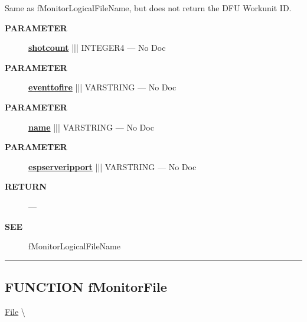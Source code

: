 \par





Same as fMonitorLogicalFileName, but does not return the DFU Workunit ID.






\par
\begin{description}
\item [\colorbox{tagtype}{\color{white} \textbf{\textsf{PARAMETER}}}] \textbf{\underline{shotcount}} ||| INTEGER4 --- No Doc
\item [\colorbox{tagtype}{\color{white} \textbf{\textsf{PARAMETER}}}] \textbf{\underline{eventtofire}} ||| VARSTRING --- No Doc
\item [\colorbox{tagtype}{\color{white} \textbf{\textsf{PARAMETER}}}] \textbf{\underline{name}} ||| VARSTRING --- No Doc
\item [\colorbox{tagtype}{\color{white} \textbf{\textsf{PARAMETER}}}] \textbf{\underline{espserveripport}} ||| VARSTRING --- No Doc
\end{description}







\par
\begin{description}
\item [\colorbox{tagtype}{\color{white} \textbf{\textsf{RETURN}}}] \textbf{} --- 
\end{description}







\par
\begin{description}
\item [\colorbox{tagtype}{\color{white} \textbf{\textsf{SEE}}}] fMonitorLogicalFileName
\end{description}



\rule{\linewidth}{0.5pt}
\subsection*{\textsf{\colorbox{headtoc}{\color{white} FUNCTION}
fMonitorFile}}

\hypertarget{ecldoc:file.fmonitorfile}{}
\hspace{0pt} \hyperlink{ecldoc:File}{File} \textbackslash 


